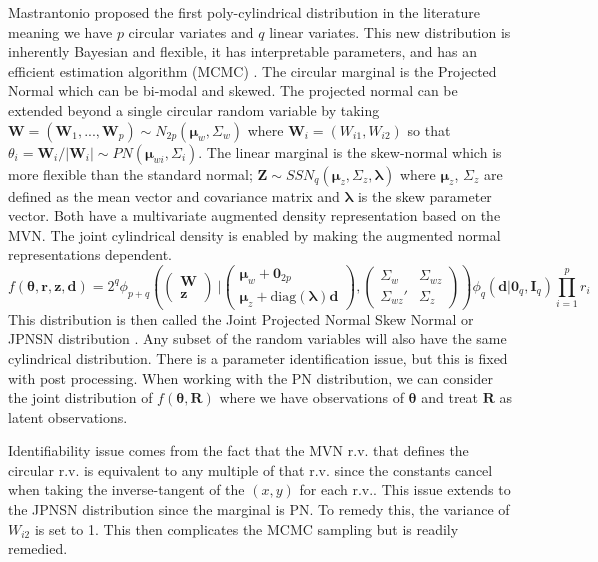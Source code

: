 Mastrantonio proposed the first poly-cylindrical distribution in the literature \cite{mastrantonio_joint_2018} meaning we have $p$ circular variates and $q$ linear variates. This new distribution is inherently Bayesian and flexible, it has interpretable parameters, and has an efficient estimation algorithm (MCMC) \cite{mastrantonio_joint_2018}. The circular marginal is the Projected Normal which can be bi-modal and skewed. The projected normal can be extended beyond a single circular random variable by taking $\mathbf{W} = (\mathbf{W}_1,...,\mathbf{W}_p) \sim N_{2p}(\bm{\mu}_w, \Sigma_w)$ where $\mathbf{W}_i = (W_{i1}, W_{i2})$ so that $\theta_i = \mathbf{W}_i / |\mathbf{W}_i| \sim PN(\bm{\mu}_{wi}, \Sigma_{i})$. The linear marginal is the skew-normal which is more flexible than the standard normal; $\mathbf{Z} \sim SSN_q(\bm{\mu}_z, \Sigma_z, \bm{\lambda})$ where $\bm{\mu}_z$, $\Sigma_z$ are defined as the mean vector and covariance matrix and $\bm{\lambda}$ is the skew parameter vector. Both have a multivariate augmented density representation based on the MVN. The joint cylindrical density is enabled by making the augmented normal representations dependent. \[f(\bm{\theta}, \mathbf{r}, \mathbf{z}, \mathbf{d}) = 2^q \phi_{p+q}\left(\begin{pmatrix}\mathbf{W}\\ \mathbf{z}\end{pmatrix} ~| \begin{pmatrix}\bm{\mu}_w + \mathbf{0}_{2p}\\ \bm{\mu}_z + \mathrm{diag}(\bm{\lambda})\mathbf{d}\end{pmatrix}, \begin{pmatrix} \Sigma_w & \Sigma_{wz} \\ \Sigma_{wz}' & \Sigma_z \end{pmatrix} \right) \phi_q(\mathbf{d} | \mathbf{0}_q, \mathbf{I}_q) \prod_{i=1}^p r_i \] This distribution is then called the Joint Projected Normal Skew Normal or JPNSN distribution \cite{mastrantonio_joint_2018}. Any subset of the random variables will also have the same cylindrical distribution. There is a parameter identification issue, but this is fixed with post processing. When working with the PN distribution, we can consider the joint distribution of $f(\bm{\theta}, \mathbf{R})$ where we have observations of $\bm{\theta}$ and treat $\mathbf{R}$ as latent observations.  

Identifiability issue comes from the fact that the MVN r.v. that defines the circular r.v. is equivalent to any multiple of that r.v. since the constants cancel when taking the inverse-tangent of the $(x,y)$ for each r.v.\cite{mastrantonio_joint_2018}. This issue extends to the JPNSN distribution since the marginal is PN. To remedy this, the variance of $W_{i2}$ is set to 1. This then complicates the MCMC sampling but is readily remedied.  


